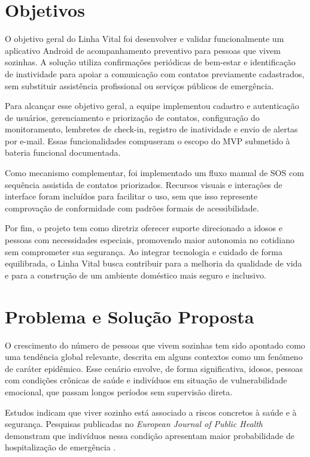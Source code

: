\section{Objetivos}

O objetivo geral do Linha Vital foi desenvolver e validar funcionalmente um aplicativo Android de acompanhamento preventivo para pessoas que vivem sozinhas. A solução utiliza confirmações periódicas de bem-estar e identificação de inatividade para apoiar a comunicação com contatos previamente cadastrados, sem substituir assistência profissional ou serviços públicos de emergência.

Para alcançar esse objetivo geral, a equipe implementou cadastro e autenticação de usuários, gerenciamento e priorização de contatos, configuração do monitoramento, lembretes de check-in, registro de inatividade e envio de alertas por e-mail. Essas funcionalidades compuseram o escopo do MVP submetido à bateria funcional documentada.

Como mecanismo complementar, foi implementado um fluxo manual de SOS com sequência assistida de contatos priorizados. Recursos visuais e interações de interface foram incluídos para facilitar o uso, sem que isso represente comprovação de conformidade com padrões formais de acessibilidade.

Por fim, o projeto tem como diretriz oferecer suporte direcionado a idosos e pessoas com necessidades especiais, promovendo maior autonomia no cotidiano sem comprometer sua segurança. Ao integrar tecnologia e cuidado de forma equilibrada, o Linha Vital busca contribuir para a melhoria da qualidade de vida e para a construção de um ambiente doméstico mais seguro e inclusivo.

\section{Problema e Solução Proposta}

O crescimento do número de pessoas que vivem sozinhas tem sido apontado como uma tendência global relevante, descrita em alguns contextos como um fenômeno de caráter epidêmico. Esse cenário envolve, de forma significativa, idosos, pessoas com condições crônicas de saúde e indivíduos em situação de vulnerabilidade emocional, que passam longos períodos sem supervisão direta.

Estudos indicam que viver sozinho está associado a riscos concretos à saúde e à segurança. Pesquisas publicadas no \textit{European Journal of Public Health} demonstram que indivíduos nessa condição apresentam maior probabilidade de hospitalização de emergência \cite{pimouguet2017}.

